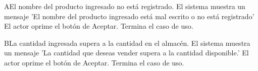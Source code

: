 \begin{UCtrayectoriaA}{A}{El nombre del producto ingresado no está registrado.}
			\UCpaso El sistema muestra un mensaje 'El nombre del producto ingresado está mal escrito o no está registrado'
			\UCpaso El actor oprime el botón de Aceptar.
			\UCpaso[] Termina el caso de uso.
\end{UCtrayectoriaA}

\begin{UCtrayectoriaA}{B}{La cantidad ingresada supera a la cantidad en el almacén.}
			\UCpaso El sistema muestra un mensaje 'La cantidad que deseas vender supera a la cantidad disponible.'
			\UCpaso El actor oprime el botón de Aceptar.
			\UCpaso[] Termina el caso de uso.
\end{UCtrayectoriaA}
